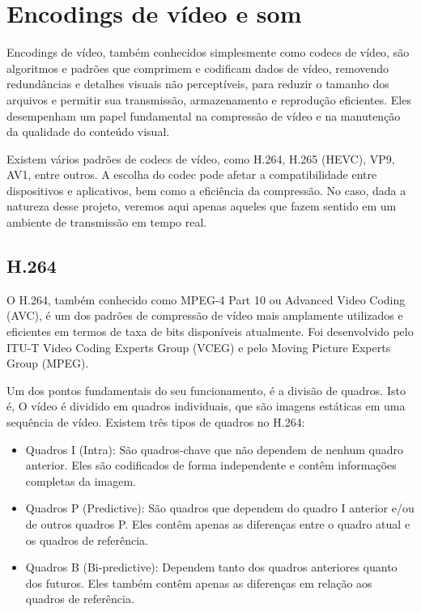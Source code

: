 \documentclass[12pt, %
openright, 
oneside, %
a4paper,    %
brazil]{facom-ufu-abntex2}
\begin{document}
\section{Encodings de vídeo e som}

Encodings de vídeo, também conhecidos simplesmente como codecs de vídeo, são
algoritmos e padrões que comprimem e codificam dados de vídeo, removendo
redundâncias e detalhes visuais não perceptíveis, para reduzir o tamanho dos
arquivos e permitir sua transmissão, armazenamento e reprodução eficientes.
Eles desempenham um papel fundamental na compressão de vídeo e na manutenção da
qualidade do conteúdo visual.

Existem vários padrões de codecs de vídeo, como H.264, H.265 (HEVC), VP9, AV1,
entre outros. A escolha do codec pode afetar a compatibilidade entre
dispositivos e aplicativos, bem como a eficiência da compressão. No caso, dada
a natureza desse projeto, veremos aqui apenas aqueles que fazem sentido em um
ambiente de transmissão em tempo real.

\subsection{H.264}

O H.264, também conhecido como MPEG-4 Part 10 ou Advanced Video Coding (AVC), é
um dos padrões de compressão de vídeo mais amplamente utilizados e eficientes
em termos de taxa de bits disponíveis atualmente. Foi desenvolvido pelo ITU-T
Video Coding Experts Group (VCEG) e pelo Moving Picture Experts Group (MPEG).

Um dos pontos fundamentais do seu funcionamento, é a divisão de quadros. Isto
é, O vídeo é dividido em quadros individuais, que são imagens estáticas em uma
sequência de vídeo. Existem três tipos de quadros no H.264:

\begin{itemize}
	\item Quadros I (Intra): São quadros-chave que não dependem de nenhum quadro
	      anterior. Eles são codificados de forma independente e contêm informações
	      completas da imagem.
	\item Quadros P (Predictive): São quadros que dependem do quadro I anterior e/ou de
	      outros quadros P. Eles contêm apenas as diferenças entre o quadro atual e os
	      quadros de referência.
	\item Quadros B (Bi-predictive): Dependem tanto dos quadros anteriores quanto dos
	      futuros. Eles também contêm apenas as diferenças em relação aos quadros de
	      referência.
\end{itemize}
\end{document}
